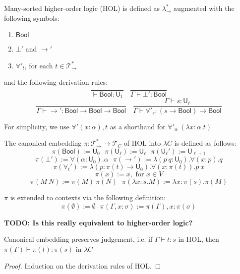 \begin{definition} Many-sorted higher-order logic (HOL) is defined as $\lambda_\to^*$ augmented
  with the following symbols:
  \begin{enumerate}
    \item $\mathsf{Bool}$
    \item $\bot'$ and $\to'$
    \item $\forall'_t$, for each $t \in \mathcal{T}_\to^*$
  \end{enumerate}
  
  \noindent and the following derivation rules:
  $$\frac{}{\vdash \mathsf{Bool} : \mathsf{U}_1} \ \ \ \ \frac{}{\Gamma \vdash \bot' : \mathsf{Bool}}$$
  $$\frac{}{\Gamma \vdash \to' : \mathsf{Bool} \to \mathsf{Bool} \to \mathsf{Bool}} \ \ \ \
  \frac{\Gamma \vdash s : \mathsf{U}_\ell}{\Gamma \vdash \forall'_s : (s \to \mathsf{Bool}) \to \mathsf{Bool}}$$
  
  \noindent For simplicity, we use $\forall' (x : \alpha), t$ as a shorthand for $\forall'_\alpha \ (\lambda x : \alpha. t)$

  \noindent The canonical embedding $\pi : \mathcal{T}_\to^* \to \mathcal{T}_C$ of HOL into $\lambda C$ is defined as follows:
  $$\pi(\mathsf{Bool}) := \mathsf{U}_0 \ \ \ \pi(\mathsf{U}_\ell) := \mathsf{U}_\ell \ \ \
    \pi(\mathsf{U}_\ell') := \mathsf{U}_{\ell + 1}$$
  $$\pi(\bot') := \forall (\alpha : \mathsf{U}_0). \alpha \ \ \
  \pi(\to') := \lambda (p \ q : \mathsf{U}_0). \forall (x : p). q$$
  $$\pi(\forall_t') := \lambda (p : \pi(t) \to \mathsf{U}_0). \forall (x : \pi(t)). p \ x$$
  $$\pi(x) := x, \text{ for } x \in V$$
  $$\pi(M \ N) := \pi(M) \ \pi(N) \ \ \ \pi(\lambda x : s. M) := \lambda x : \pi(s). \pi(M)$$

  \noindent $\pi$ is extended to contexts via the following definition:
  $$\pi(\emptyset) := \emptyset \ \ \ \pi(\Gamma, x : \sigma) := \pi(\Gamma), x : \pi(\sigma)$$

  \noindent \textbf{TODO: Is this really equivalent to higher-order logic?}

\end{definition}

\begin{theorem}\label{ceptj} Canonical embedding preserves judgement, i.e. if $\Gamma \vdash t : s$ in HOL, then
  $\pi(\Gamma) \vdash \pi(t) : \pi(s)$ in $\lambda C$ \end{theorem}
\begin{proof} Induction on the derivation rules of HOL. \end{proof}

